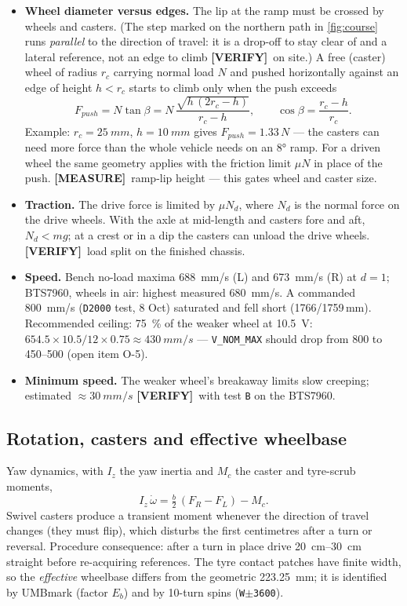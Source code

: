 \documentclass[11pt,a4paper]{article}
\newcommand{\mk}[2]{\textsf{\scriptsize\bfseries\colorbox{#1bg}{\color{#1}[#2]}}}
\newcommand{\MEASURE}{\mk{warn}{MEASURE}}
\newcommand{\VERIFY}{\mk{cold}{VERIFY}}
\newcommand{\code}[1]{\texttt{\small #1}}
\begin{document}
\begin{itemize}[leftmargin=6mm]
\item \textbf{Wheel diameter versus edges.} The lip at the ramp must be crossed
by wheels and casters. (The step marked on the northern path in
\cref{fig:course} runs \emph{parallel} to the direction of travel: it is a
drop-off to stay clear of and a lateral reference, not an edge to climb
\VERIFY\ on site.) A free
(caster) wheel of radius $r_c$ carrying normal load $N$ and pushed horizontally
against an edge of height $h<r_c$ starts to climb only when the push exceeds
\begin{equation}
F_{push}=N\tan\beta=N\,\frac{\sqrt{h\,(2r_c-h)}}{r_c-h},\qquad \cos\beta=\frac{r_c-h}{r_c}.
\end{equation}
Example: $r_c=\qty{25}{mm}$, $h=\qty{10}{mm}$ gives $F_{push}=1.33\,N$ --- the
casters can need more force than the whole vehicle needs on an \ang{8} ramp. For a
driven wheel the same geometry applies with the friction limit $\mu N$ in place of
the push. \MEASURE\ ramp-lip height --- this gates wheel and caster size.
\item \textbf{Traction.} The drive force is limited by $\mu N_d$, where $N_d$ is
the normal force on the drive wheels. With the axle at mid-length and casters
fore and aft, $N_d<mg$; at a crest or in a dip the casters can unload the drive
wheels. \VERIFY\ load split on the finished chassis.
\item \textbf{Speed.} Bench no-load maxima \qty{688}{mm/s} (L) and \qty{673}{mm/s}
(R) at $d=1$; BTS7960, wheels in air: highest measured \qty{680}{mm/s}. A
commanded \qty{800}{mm/s} (\code{D2000} test, 8 Oct) saturated and fell short
(1766/1759\,mm). Recommended ceiling: \qty{75}{\percent} of the weaker wheel at
\qty{10.5}{V}: $654.5\times10.5/12\times0.75\approx\qty{430}{mm/s}$ ---
\code{V\_NOM\_MAX} should drop from 800 to 450--500 (open item O-5).
\item \textbf{Minimum speed.} The weaker wheel's breakaway limits slow creeping;
estimated $\approx\qty{30}{mm/s}$ \VERIFY\ with test \code{B} on the BTS7960.
\end{itemize}

\subsection{Rotation, casters and effective wheelbase}\label{sec:rotation}

Yaw dynamics, with $I_z$ the yaw inertia and $M_c$ the caster and tyre-scrub
moments,
\begin{equation}
I_z\,\dot\omega = \tfrac b2\,(F_R-F_L) - M_c .
\end{equation}
Swivel casters produce a transient moment whenever the direction of travel
changes (they must flip), which disturbs the first centimetres after a turn or
reversal. Procedure consequence: after a turn in place drive
\qtyrange{20}{30}{cm} straight before re-acquiring references. The tyre contact
patches have finite width, so the \emph{effective} wheelbase differs from the
geometric \qty{223.25}{mm}; it is identified by UMBmark (factor $E_b$) and by
10-turn spins (\code{W$\pm$3600}).
\end{document}
